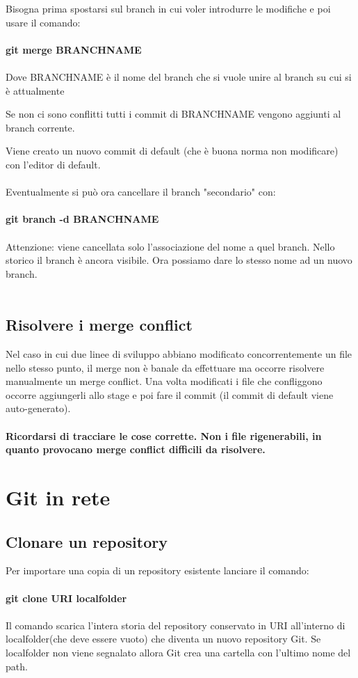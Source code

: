 \documentclass[a4paper,12pt]{report}
\begin{document}
Bisogna prima spostarsi sul branch in cui voler introdurre le modifiche e poi usare il comando:
\\\\
\textbf{git merge BRANCHNAME}
\\\\
Dove BRANCHNAME è il nome del branch che si vuole unire al branch su cui si è attualmente

Se non ci sono conflitti tutti i commit di BRANCHNAME vengono aggiunti al branch corrente.

Viene creato un nuovo commit di default (che è buona norma non modificare) con l'editor di default.
\\\\
Eventualmente si può ora cancellare il branch "secondario" con:
\\\\
\textbf{git branch -d BRANCHNAME}
\\\\
Attenzione: viene cancellata solo l'associazione del nome a quel branch. Nello storico il branch è ancora visibile. Ora possiamo dare lo stesso nome ad un nuovo branch.
\\\\
\section{Risolvere i merge conflict}
Nel caso in cui due linee di sviluppo abbiano modificato concorrentemente un file nello stesso punto, il merge non è banale da effettuare ma occorre risolvere manualmente un merge conflict.
Una volta modificati i file che confliggono occorre aggiungerli allo stage e poi fare il commit (il commit di default viene auto-generato).
\\\\
\textbf{Ricordarsi di tracciare le cose corrette. Non i file rigenerabili, in quanto provocano merge conflict difficili da risolvere.}


\chapter{Git in rete}

\section{Clonare un repository}
Per importare una copia di un repository esistente lanciare il comando:
\\\\
\textbf{git clone URI localfolder}
\\\\
Il comando scarica l'intera storia del repository conservato in URI all'interno di localfolder(che deve essere vuoto) che diventa un nuovo repository Git. Se localfolder non viene segnalato allora Git crea una cartella con l'ultimo nome del path.
\end{document}
